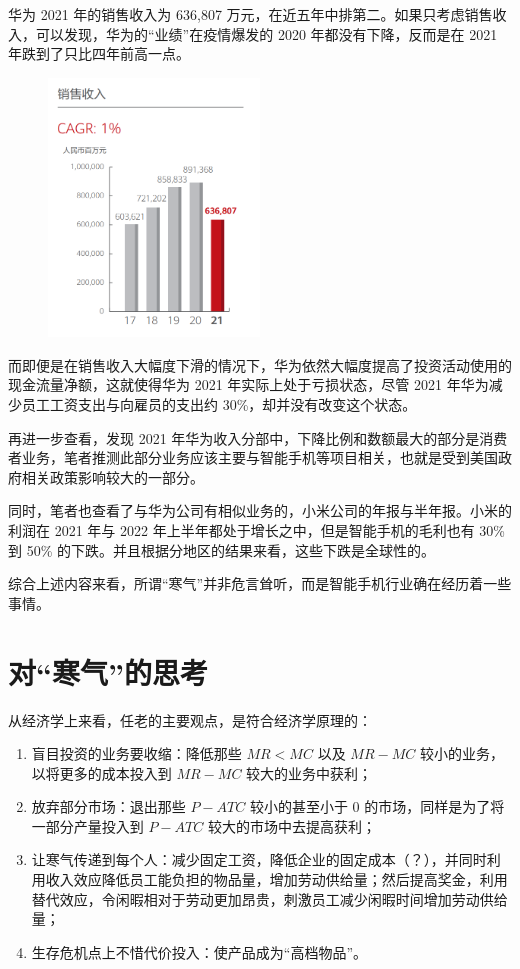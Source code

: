 \documentclass[12pt]{ctexart}
\begin{document}
    华为 2021 年的销售收入为 636,807 万元，在近五年中排第二。如果只考虑销售收入，可以发现，华为的``业绩''在疫情爆发的 2020 年都没有下降，反而是在 2021 年跌到了只比四年前高一点。

    \begin{figure}[hp]
        \centering
        \includegraphics[width=0.5\textwidth]{pics/2021-sell-income.png}
    \end{figure}

    而即便是在销售收入大幅度下滑的情况下，华为依然大幅度提高了投资活动使用的现金流量净额\cite{annual-2021}，这就使得华为 2021 年实际上处于亏损状态，尽管 2021 年华为减少员工工资支出与向雇员的支出约 30\%，却并没有改变这个状态。

    再进一步查看，发现 2021 年华为收入分部中，下降比例和数额最大的部分是消费者业务，笔者推测此部分业务应该主要与智能手机等项目相关，也就是受到美国政府相关政策影响较大的一部分。

    同时，笔者也查看了与华为公司有相似业务的，小米公司的年报与半年报。小米的利润在 2021 年与 2022 年上半年都处于增长之中，但是智能手机的毛利也有 30\% 到 50\% 的下跌。并且根据分地区的结果来看，这些下跌是全球性的。

    综合上述内容来看，所谓``寒气''并非危言耸听，而是智能手机行业确在经历着一些事情。

    \newpage
    \section{对``寒气''的思考}

    从经济学上来看，任老的主要观点，是符合经济学原理的：

    \begin{enumerate}
        \item 盲目投资的业务要收缩：降低那些 $MR < MC$ 以及 $MR - MC$ 较小的业务，以将更多的成本投入到 $MR - MC$ 较大的业务中获利；
        \item 放弃部分市场：退出那些 $P - ATC$ 较小的甚至小于 0 的市场，同样是为了将一部分产量投入到 $P - ATC$ 较大的市场中去提高获利；
        \item 让寒气传递到每个人：减少固定工资，降低企业的固定成本（？），并同时利用收入效应降低员工能负担的物品量，增加劳动供给量；然后提高奖金，利用替代效应，令闲暇相对于劳动更加昂贵，刺激员工减少闲暇时间增加劳动供给量；
        \item 生存危机点上不惜代价投入：使产品成为``高档物品''。
    \end{enumerate}
    \nocite{*}
    
\end{document}
